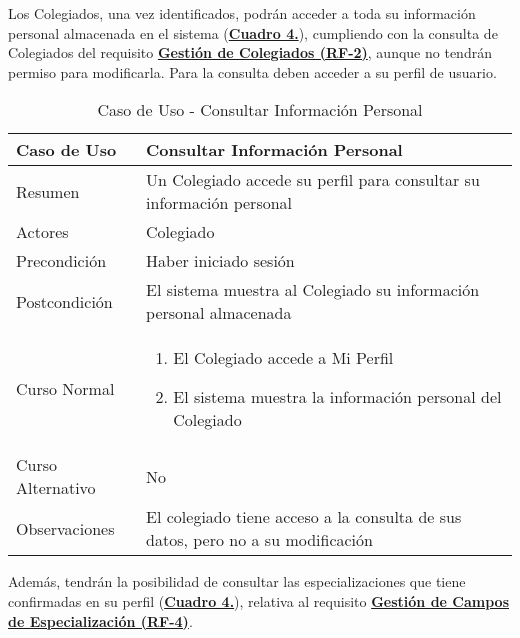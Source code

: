 \addtocounter{tabla}{1}
Los Colegiados, una vez identificados, podrán acceder a toda su información personal almacenada en el sistema (\textbf{\hyperref[tab:cucConsultaInfoPersonal]{Cuadro 4.}}), cumpliendo con la consulta de Colegiados del requisito \textbf{\hyperref[tab:rfGestColeg]{Gestión de Colegiados (RF-2)}}, aunque no tendrán permiso para modificarla. Para la consulta deben acceder a su perfil de usuario.

\begin{table}[!htbp]
  \centering  \addtocounter{casouso}{1}
  \begin{tabular}{|l | p{100mm}|}
    \textbf{Caso de Uso}  & \textbf{Consultar Información Personal} \\ \hline
    Resumen 		 & Un Colegiado accede su perfil para consultar su información personal \\ \hline
    Actores  		 & Colegiado \\ \hline
    Precondición  	 & Haber iniciado sesión \\ \hline
    Postcondición  	 & El sistema muestra al Colegiado su información personal almacenada \\ \hline
    Curso Normal   	 & \begin{enumerate}
	  \item El Colegiado accede a Mi Perfil
	  \item El sistema muestra la información personal del Colegiado
    \end{enumerate}  \\ \hline
    Curso Alternativo  & No  \\ \hline
    Observaciones 	 & El colegiado tiene acceso a la consulta de sus datos, pero no a su modificación \\ \hline
  \end{tabular}
  \caption{Caso de Uso  - Consultar Información Personal}
  \label{tab:cucConsultaInfoPersonal}
\end{table}
\FloatBarrier

\addtocounter{tabla}{1}
Además, tendrán la posibilidad de consultar las especializaciones que tiene confirmadas en su perfil (\textbf{\hyperref[tab:cucConsultaEspec]{Cuadro 4.}}), relativa al requisito \textbf{\hyperref[tab:rfGestEspec]{Gestión de Campos de Especialización (RF-4)}}.

